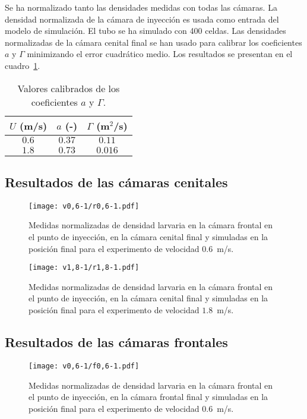\documentclass[a4paper]{article}
\begin{document}
Se ha normalizado tanto las densidades medidas con todas las cámaras. La
densidad normalizada de la cámara de inyección es usada como entrada del modelo
de simulación. El tubo se ha simulado con 400 celdas. Las densidades
normalizadas de la cámara cenital final se han usado para calibrar los
coeficientes $a$ y $\Gamma$ minimizando el error cuadrático medio. Los
resultados se presentan en el cuadro~\ref{TabCalibration}.

\begin{table}[ht!]
\centering
\caption{Valores calibrados de los coeficientes $a$ y $\Gamma$.
\label{TabCalibration}}
\begin{tabular}{ccc}
$U$ (m/s) & $a$ (-) & $\Gamma$ (m$^2$/s) \\
\hline
$0.6$ & $0.37$ & $0.11$ \\
$1.8$ & $0.73$ & $0.016$
\end{tabular}
\end{table}

\newpage
\subsection{Resultados de las cámaras cenitales}

\begin{figure}[ht!]
\centering
\texttt{[image: v0,6-1/r0,6-1.pdf]}
\caption{Medidas normalizadas de densidad larvaria en la cámara frontal en el
punto de inyección, en la cámara cenital final y simuladas en la posición final
para el experimento de velocidad $0.6$~m/s.}
\end{figure}

\begin{figure}[ht!]
\centering
\texttt{[image: v1,8-1/r1,8-1.pdf]}
\caption{Medidas normalizadas de densidad larvaria en la cámara frontal en el
punto de inyección, en la cámara cenital final y simuladas en la posición final
para el experimento de velocidad $1.8$~m/s.}
\end{figure}

\newpage
\subsection{Resultados de las cámaras frontales}

\begin{figure}[ht!]
\centering
\texttt{[image: v0,6-1/f0,6-1.pdf]}
\caption{Medidas normalizadas de densidad larvaria en la cámara frontal en el
punto de inyección, en la cámara frontal final y simuladas en la posición final
para el experimento de velocidad $0.6$~m/s.}
\end{figure}
\end{document}
